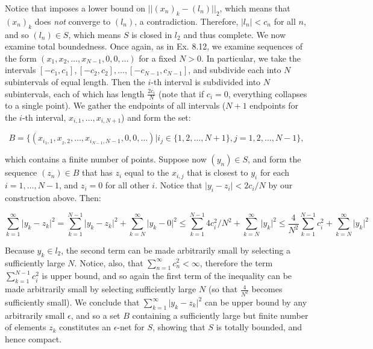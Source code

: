 \begin{solution}
    Notice that imposes a lower bound on $\lvert \lvert (x_n)_k - (l_n) \rvert \rvert_2$, which means that $(x_n)_k$ does \textit{not} converge to $(l_n)$, a contradiction.
    Therefore, $\lvert l_n \rvert < c_n$ for all $n$, and so $(l_n) \in S$, which means $S$ is closed in $l_2$ and thus complete.
    We now examine total boundedness.
    Once again, as in Ex. 8.12, we examine sequences of the form $(x_1, x_2, \ldots, x_{N - 1}, 0, 0, \ldots)$ for a fixed $N > 0$.
    In particular, we take the intervals $[-c_1, c_1], [-c_2, c_2], \ldots, [-c_{N - 1}, c_{N - 1}]$, and subdivide each into $N$ subintervals of equal length.
    Then the $i$-th interval is subdivided into $N$ subintervals, each of which has length $\frac{2c_i}{N}$ (note that if $c_i = 0$, everything collapses to a single point).
    We gather the endpoints of all intervals ($N + 1$ endpoints for the $i$-th interval, $x_{i, 1}, \ldots, x_{i, N + 1}$) and form the set:

    \[B = \{(x_{i_1, 1}, x_{_2, 2}, \ldots, x_{i_{N - 1}, N-1}, 0, 0, \ldots) \vert i_j \in \{1, 2, \ldots, N + 1\}, j = 1, 2, \ldots, N - 1\},\]

    which contains a finite number of points.
    Suppose now $(y_n) \in S$, and form the sequence $(z_n) \in B$ that has $z_i$ equal to the $x_{i, j}$ that is closest to $y_i$ for each $i = 1, \ldots, N -1$, and $z_i = 0$ for all other $i$.
    Notice that $\lvert y_i - z_i \rvert < 2c_i/N$ by our construction above.
    Then:

    \[\sum_{k=1}^{\infty} \lvert y_k - z_k \rvert^2 = \sum_{k = 1}^{N - 1} \lvert y_k - z_k \rvert^2 + \sum_{k = N}^{\infty} \lvert y_k - 0 \rvert^2 \leq \sum_{k = 1}^{N - 1} 4c_i^2/N^2 + \sum_{k = N}^{\infty} \lvert y_k \rvert^2 \leq \frac{4}{N^2} \sum_{k = 1}^{N - 1} c_i^2 + \sum_{k = N}^{\infty} \lvert y_k \rvert^2\]

    Because $y_k \in l_2$, the second term can be made arbitrarily small by selecting a sufficiently large $N$.
    Notice, also, that $\sum_{n=1}^{\infty}c_n^2 < \infty$, therefore the term $\sum_{k=1}^{N - 1} c_i^2$ is upper bound, and so again the first term of the inequality can be made arbitrarily small by selecting sufficiently large $N$ (so that $\frac{4}{N^2}$ becomes sufficiently small).
    We conclude that $\sum_{k=1}^{\infty} \lvert y_k - z_k \rvert^2$ can be upper bound by any arbitrarily small $\epsilon$, and so a set $B$ containing a sufficiently large but finite number of elements $z_k$ constitutes an $\epsilon$-net for $S$, showing that $S$ is totally bounded, and hence compact.
\end{solution}

